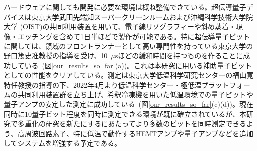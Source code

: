 \documentclass[11pt,a4j,dvipdfmx]{jarticle} 					%
\newcommand{\研究課題名}{誤り耐性量子コンピュータに向けた誤り訂正技術の開発(仮)}
\newcommand{\研究機関名}{東京大学}
\newcommand{\研究代表者氏名}{寺師弘二}
\newcommand{\研究期間の最終元号年度}{10}  %
\newcommand{\mybf}[1]{{\bfseries\sffamily#1}}
\begin{document}
ハードウェアに関しても開発に必要な環境は概ね整備できている。超伝導量子デバイスは東京大学武田先端知スーパークリーンルームおよび沖縄科学技術大学院大学 (OIST)の共同利用装置を用いて、電子線リソグラフィーや斜め蒸着・現像・エッチングを含めて1日半ほどで製作が可能である。特に超伝導量子ビットに関しては、領域のフロントランナーとして高い専門性を持っている東京大学の野口篤史准教授の指導を受け、10~$\mu \mathrm{s}$ほどの緩和時間を持つものを作ることに成功している~(図\ref{our_results_so_far}(a))。これは本研究に用いる補助量子ビットとしての性能をクリアしている。測定は東京大学低温科学研究センターの福山寛特任教授の指導の下、2022年4月より低温科学センター・極低温プラットフォームの共同利用装置群を立ち上げ、希釈冷凍機を用いた低温環境での量子ビットや量子アンプの安定した測定に成功している~(図\ref{our_results_so_far}(c)(d))。現在同時に10量子ビット程度を同時に測定できる環境が既に確立されているが、本研究で多重化の研究を新たにするにあたってより多数のビットを同時測定できるよう、高周波回路素子、特に低温で動作するHEMTアンプや量子アンプなどを追加してシステムを増強する予定である。

\end{document}
